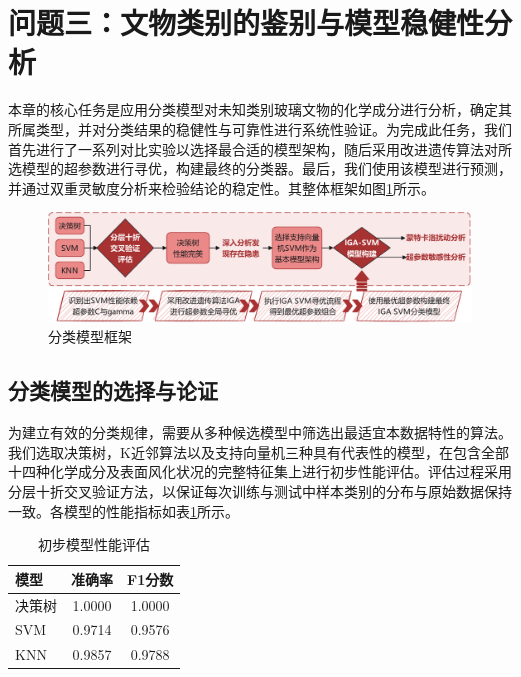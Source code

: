 \section{问题三：文物类别的鉴别与模型稳健性分析}

本章的核心任务是应用分类模型对未知类别玻璃文物的化学成分进行分析，确定其所属类型，并对分类结果的稳健性与可靠性进行系统性验证。为完成此任务，我们首先进行了一系列对比实验以选择最合适的模型架构，随后采用改进遗传算法对所选模型的超参数进行寻优，构建最终的分类器。最后，我们使用该模型进行预测，并通过双重灵敏度分析来检验结论的稳定性。其整体框架如图\ref{fig:model_framework}所示。

\begin{figure}[H]
    \centering
    \includegraphics[width=\textwidth]{figs/5问题三/第三问框架.pdf}
    \caption{分类模型框架}
    \label{fig:model_framework}
\end{figure}

\subsection{分类模型的选择与论证}

为建立有效的分类规律，需要从多种候选模型中筛选出最适宜本数据特性的算法。我们选取决策树，K近邻算法以及支持向量机三种具有代表性的模型，在包含全部十四种化学成分及表面风化状况的完整特征集上进行初步性能评估。评估过程采用分层十折交叉验证方法，以保证每次训练与测试中样本类别的分布与原始数据保持一致。各模型的性能指标如表\ref{tab:model_performance}所示。

\begin{table}[H]
    \centering
    \caption{初步模型性能评估}
    \label{tab:model_performance}
    \begin{tabular}{lcc}
        \toprule
        \textbf{模型} & \textbf{准确率} & \textbf{F1分数} \\
        \midrule
        决策树 & 1.0000 & 1.0000 \\
        SVM & 0.9714 & 0.9576 \\
        KNN & 0.9857 & 0.9788 \\
        \bottomrule
    \end{tabular}
\end{table}

